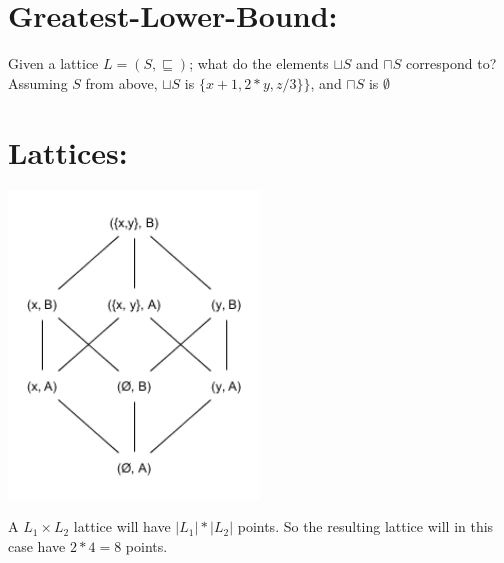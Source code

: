 \documentclass{article}
\begin{document}
\section*{Greatest-Lower-Bound:}
Given a lattice $L = (S, \sqsubseteq)$; what do the elements $\sqcup S$ and $\sqcap S$ correspond to? Assuming $S$ from above, $\sqcup S$ is $\{x+1, 2*y, z/3\}\}$, and $\sqcap S$ is $\emptyset$
\section*{Lattices:}
\includegraphics[width=0.5\textwidth]{Lattices}

\noindent A $L_1 \times L_2$ lattice will have $|L_1| * |L_2|$ points. So the resulting lattice will in this case have $2 * 4 = 8$ points.
\end{document}
